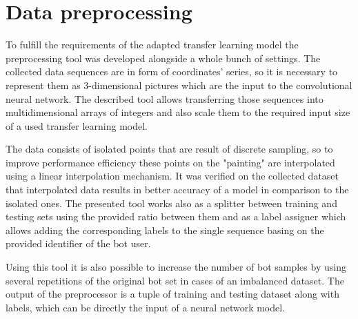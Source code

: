 \section{Data preprocessing}\label{sec:data-preprocessing}
To fulfill the requirements of the adapted transfer learning model the preprocessing tool was developed alongside a whole bunch of settings.
The collected data sequences are in form of coordinates' series, so it is necessary to represent them as 3-dimensional pictures which are the input to the convolutional neural network.
The described tool allows transferring those sequences into multidimensional arrays of integers and also scale them to the required input size of a used transfer learning model.

The data consists of isolated points that are result of discrete sampling, so to improve performance efficiency these points on the "painting" are interpolated using a linear interpolation mechanism.
It was verified on the collected dataset that interpolated data results in better accuracy of a model in comparison to the isolated ones.
The presented tool works also as a splitter between training and testing sets using the provided ratio between them and as a label assigner which allows adding the corresponding labels to the single sequence basing on the provided identifier of the bot user.

Using this tool it is also possible to increase the number of bot samples by using several repetitions of the original bot set in cases of an imbalanced dataset.
The output of the preprocessor is a tuple of training and testing dataset along with labels, which can be directly the input of a neural network model.